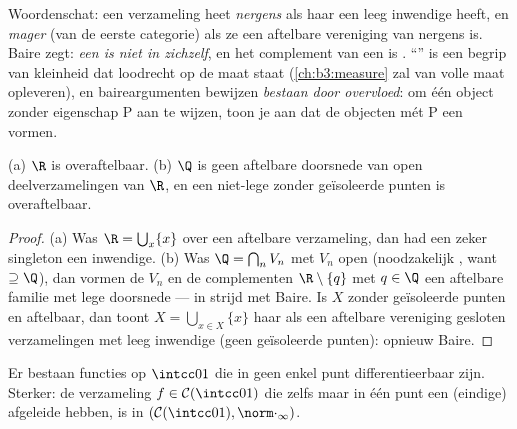 \begin{remark}\label{rem:b3:complete:meagre}
Woordenschat: een verzameling heet \emph{nergens } als haar
 een leeg inwendige heeft, en \emph{mager} (van de eerste categorie) als ze een aftelbare
vereniging van nergens  is. Baire zegt: \emph{een
 is niet  in zichzelf}, en het
complement van een  is . ``'' is een
begrip van kleinheid dat loodrecht op de maat staat
(\cref{ch:b3:measure} zal  van volle maat
opleveren), en baireargumenten bewijzen \emph{bestaan door
overvloed}: om één object zonder eigenschap P aan te wijzen, toon
je aan dat de objecten mét P een  vormen.
\end{remark}

\begin{corollary}\label{cor:b3:complete:bairecors}
(a) $\R$ is overaftelbaar. (b) $\Q$ is geen aftelbare doorsnede
van open deelverzamelingen van $\R$, en een niet-lege  zonder geïsoleerde punten is overaftelbaar.
\end{corollary}

\begin{proof}
(a) Was $\R = \bigcup_{x}\{x\}$ over een aftelbare verzameling,
dan had een zeker singleton een inwendige. (b) Was $\Q =
\bigcap_n V_n$ met $V_n$ open (noodzakelijk , want $\supseteq
\Q$), dan vormen de $V_n$ en de complementen $\R\setminus\{q\}$
met $q \in \Q$ een aftelbare familie   met
lege doorsnede --- in strijd met Baire. Is $X$  zonder
geïsoleerde punten en aftelbaar, dan toont $X = \bigcup_{x \in
X}\{x\}$ haar als een aftelbare vereniging gesloten verzamelingen
met leeg inwendige (geen geïsoleerde punten): opnieuw Baire.
\end{proof}

\begin{theorem}
\label{thm:b3:complete:nowherediff}
Er bestaan  functies op $\intcc01$ die in geen enkel punt
differentieerbaar zijn. Sterker: de verzameling $f \in \mathcal
C(\intcc01)$ die zelfs maar in één punt een (eindige) afgeleide
hebben, is  in $(\mathcal C(\intcc01),
\norm\cdot_\infty)$.
\end{theorem}

